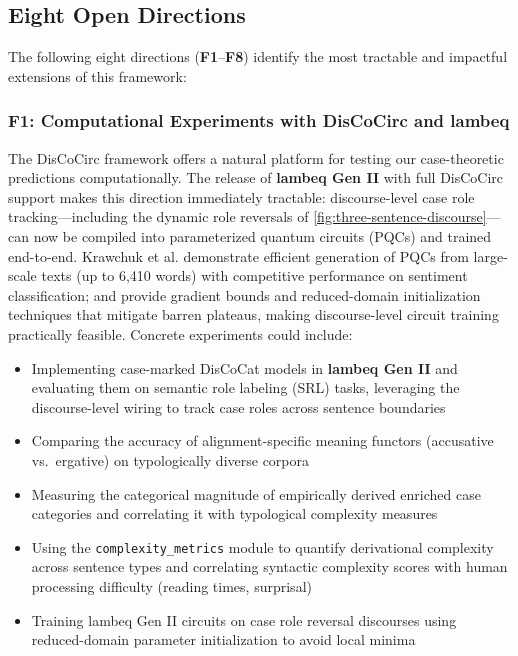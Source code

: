 \documentclass[
]{article}
\providecommand{\tightlist}{%
  \setlength{\itemsep}{0pt}\setlength{\parskip}{0pt}}
\begin{document}
\subsection{Eight Open Directions}\label{sec:future-directions}

The following eight directions (\textbf{F1}--\textbf{F8}) identify the
most tractable and impactful extensions of this framework:

\subsubsection{F1: Computational Experiments with DisCoCirc and
lambeq}\label{f1-computational-experiments-with-discocirc-and-lambeq}

The DisCoCirc framework \citep{defelice2022discocirc} offers a natural
platform for testing our case-theoretic predictions computationally. The
release of \textbf{lambeq Gen II} \citep{lambeq2025genii} with full
DisCoCirc support makes this direction immediately tractable:
discourse-level case role tracking---including the dynamic role
reversals of \autoref{fig:three-sentence-discourse}---can now be
compiled into parameterized quantum circuits (PQCs) and trained
end-to-end. Krawchuk et al. \citep{krawchuk2025paramqnlp} demonstrate
efficient generation of PQCs from large-scale texts (up to 6,410 words)
with competitive performance on sentiment classification;
\citep{letcher2024tight} and \citep{rad2024trainability} provide
gradient bounds and reduced-domain initialization techniques that
mitigate barren plateaus, making discourse-level circuit training
practically feasible. Concrete experiments could include:

\begin{itemize}
\tightlist
\item
  Implementing case-marked DisCoCat models in \textbf{lambeq Gen II} and
  evaluating them on semantic role labeling (SRL) tasks, leveraging the
  discourse-level wiring to track case roles across sentence boundaries
\item
  Comparing the accuracy of alignment-specific meaning functors
  (accusative vs.~ergative) on typologically diverse corpora
\item
  Measuring the categorical magnitude of empirically derived enriched
  case categories and correlating it with typological complexity
  measures
\item
  Using the \texttt{complexity\_metrics} module to quantify derivational
  complexity across sentence types and correlating syntactic complexity
  scores with human processing difficulty (reading times, surprisal)
\item
  Training lambeq Gen II circuits on case role reversal discourses using
  reduced-domain parameter initialization \citep{rad2024trainability} to
  avoid local minima
\end{itemize}
\end{document}
